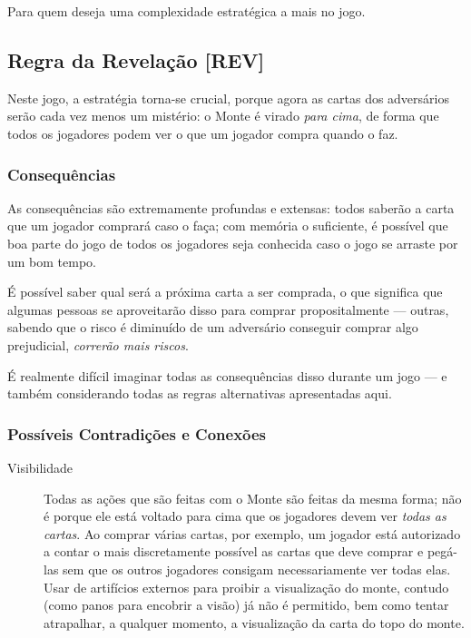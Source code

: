 Para quem deseja uma complexidade estratégica a mais no jogo.

\subsection{Regra da Revelação [REV]}

Neste jogo, a estratégia torna-se crucial, porque agora as cartas dos adversários serão cada vez menos um mistério: o Monte é virado \emph{para cima}, de forma que todos os jogadores podem ver o que um jogador compra quando o faz.

\subsubsection{Consequências}

As consequências são extremamente profundas e extensas: todos saberão a carta que um jogador comprará caso o faça; com memória o suficiente, é possível que boa parte do jogo de todos os jogadores seja conhecida caso o jogo se arraste por um bom tempo.

É possível saber qual será a próxima carta a ser comprada, o que significa que algumas pessoas se aproveitarão disso para comprar propositalmente --- outras, sabendo que o risco é diminuído de um adversário conseguir comprar algo prejudicial, \emph{correrão mais riscos}.

É realmente difícil imaginar todas as consequências disso durante um jogo --- e também considerando todas as regras alternativas apresentadas aqui.

\subsubsection{Possíveis Contradições e Conexões}

\begin{description}
\item[Visibilidade]{Todas as ações que são feitas com o Monte são feitas da mesma forma; não é porque ele está voltado para cima que os jogadores devem ver \emph{todas as cartas}. Ao comprar várias cartas, por exemplo, um jogador está autorizado a contar o mais discretamente possível as cartas que deve comprar e pegá-las sem que os outros jogadores consigam necessariamente ver todas elas. Usar de artifícios externos para proibir a visualização do monte, contudo (como panos para encobrir a visão) já não é permitido, bem como tentar atrapalhar, a qualquer momento, a visualização da carta do topo do monte.}
\end{description}

